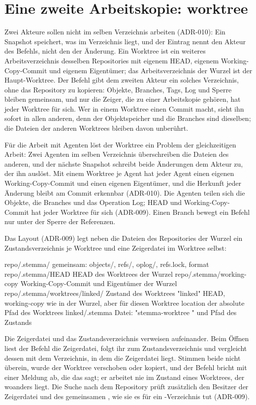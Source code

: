 \section[sec:worktree]{Eine zweite Arbeitskopie: worktree}

Zwei Akteure sollen nicht im selben Verzeichnis arbeiten (ADR-010): Ein Snapshot speichert, was im
Verzeichnis liegt, und der Eintrag nennt den Akteur des Befehls, nicht den der Änderung.
Ein Worktree ist ein weiteres Arbeitsverzeichnis desselben Repositories mit eigenem HEAD,
eigenem Working-Copy-Commit und eigenem Eigentümer; das Arbeitsverzeichnis der Wurzel ist der
Haupt-Worktree. Der Befehl  gibt dem zweiten Akteur ein solches Verzeichnis,
ohne das Repository zu kopieren: Objekte, Branches, Tags, Log und Sperre bleiben gemeinsam,
und nur die Zeiger, die zu einer Arbeitskopie gehören, hat jeder Worktree für sich.
Wer in einem Worktree einen Commit macht, sieht ihn sofort in allen anderen, denn der
Objektspeicher und die Branches sind dieselben; die Dateien der anderen Worktrees bleiben
davon unberührt.

Für die Arbeit mit Agenten löst der Worktree ein Problem der gleichzeitigen Arbeit:
Zwei Agenten im selben Verzeichnis überschreiben die Dateien des anderen,
und der nächste Snapshot schreibt beide Änderungen dem Akteur zu, der ihn auslöst.
Mit einem Worktree je Agent hat jeder Agent einen eigenen Working-Copy-Commit und einen eigenen
Eigentümer, und die Herkunft jeder Änderung bleibt am Commit erkennbar (ADR-010).
Die Agenten teilen sich die Objekte, die Branches und das Operation Log;
HEAD und Working-Copy-Commit hat jeder Worktree für sich (ADR-009).
Einen Branch bewegt ein Befehl nur unter der Sperre der Referenzen.

Das Layout (ADR-009) legt neben die Dateien des Repositories der Wurzel ein Zustandsverzeichnis
je Worktree und eine Zeigerdatei im Worktree selbst:

\starttyping
repo/.stemma/                    gemeinsam: objects/, refs/, oplog/, refs.lock, format
repo/.stemma/HEAD                HEAD des Worktrees der Wurzel
repo/.stemma/working-copy        Working-Copy-Commit und Eigentümer der Wurzel
repo/.stemma/worktrees/linked/   Zustand des Worktrees "linked"
    HEAD, working-copy           wie in der Wurzel, aber für diesen Worktree
    location                     der absolute Pfad des Worktrees
linked/.stemma                   Datei: "stemma-worktree " und Pfad des Zustands
\stoptyping

Die Zeigerdatei und das Zustandsverzeichnis verweisen aufeinander. Beim Öffnen liest der Befehl
die Zeigerdatei, folgt ihr zum Zustandsverzeichnis und vergleicht dessen  mit
dem Verzeichnis, in dem die Zeigerdatei liegt. Stimmen beide nicht überein, wurde der Worktree
verschoben oder kopiert, und der Befehl bricht mit einer Meldung ab, die das sagt; er arbeitet
nie im Zustand eines Worktrees, der woanders liegt. Die Suche nach dem Repository
prüft zusätzlich den Besitzer der Zeigerdatei und des gemeinsamen , wie sie es für
ein -Verzeichnis tut (ADR-009).

